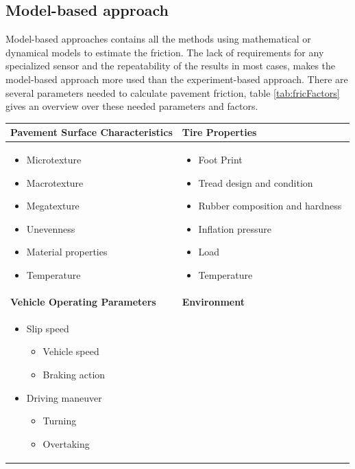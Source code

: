 \documentclass[noprint]{uit-thesis}
\begin{document}
\subsection{Model-based approach}
Model-based approaches contains all the methods using mathematical or dynamical models to estimate the friction. The lack of requirements for any specialized sensor and the repeatability of the results in most cases, makes the model-based approach more used than the experiment-based approach. There are several parameters needed to calculate pavement friction, table \ref{tab:fricFactors} gives an overview over these needed parameters and factors. 

\begin{table}[H]
\center
\begin{tabular}{|p{0.5\linewidth} | p{0.5\linewidth} |} 

 \hline
 \textbf{\large Pavement Surface
 Characteristics}
& \textbf{\large Tire Properties} \\ [0.5ex] 
 \hline

\begin{itemize}
 \item Microtexture 
 \item Macrotexture
 \item Megatexture
 \item Unevenness
 \item Material properties
 \item Temperature
\end{itemize}

& \begin{itemize}
 \item Foot Print
 \item Tread design and condition
 \item Rubber composition and hardness
 \item Inflation pressure
 \item Load
 \item Temperature 
\end{itemize} \\ 

\hline \hline
\textbf{\large Vehicle Operating Parameters} 
& \textbf{\large Environment} \\ [0.5ex] 
\hline

\begin{itemize}
 \item Slip speed
 \begin{itemize}
  \item Vehicle speed
  \item Braking action
 \end{itemize}
 \item Driving maneuver
 \begin{itemize}
  \item Turning
  \item Overtaking
 \end{itemize}
\end{itemize}


\end{tabular}
\end{table}
\end{document}

